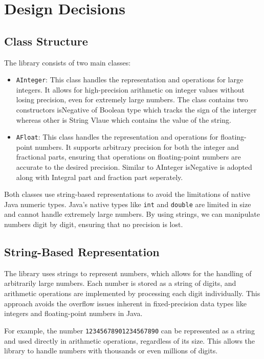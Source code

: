 \documentclass[12pt]{article}
\begin{document}
\section{Design Decisions}

\subsection{Class Structure}
The library consists of two main classes:
\begin{itemize}
    \item \texttt{AInteger}: This class handles the representation and operations for large integers. It allows for high-precision arithmetic on integer values without losing precision, even for extremely large numbers. The class contains two constructors isNegative of Boolean type which tracks the sign of the interger whereas other is String Vlaue which contains the value of the string.
    \item \texttt{AFloat}: This class handles the representation and operations for floating-point numbers. It supports arbitrary precision for both the integer and fractional parts, ensuring that operations on floating-point numbers are accurate to the desired precision. Similar to AInteger isNegative is adopted along with Integral part and fraction part seperately.
\end{itemize}

Both classes use string-based representations to avoid the limitations of native Java numeric types. Java’s native types like \texttt{int} and \texttt{double} are limited in size and cannot handle extremely large numbers. By using strings, we can manipulate numbers digit by digit, ensuring that no precision is lost. 

\subsection{String-Based Representation}
The library uses strings to represent numbers, which allows for the handling of arbitrarily large numbers. Each number is stored as a string of digits, and arithmetic operations are implemented by processing each digit individually. This approach avoids the overflow issues inherent in fixed-precision data types like integers and floating-point numbers in Java.

For example, the number \texttt{12345678901234567890} can be represented as a string and used directly in arithmetic operations, regardless of its size. This allows the library to handle numbers with thousands or even millions of digits.
\end{document}
